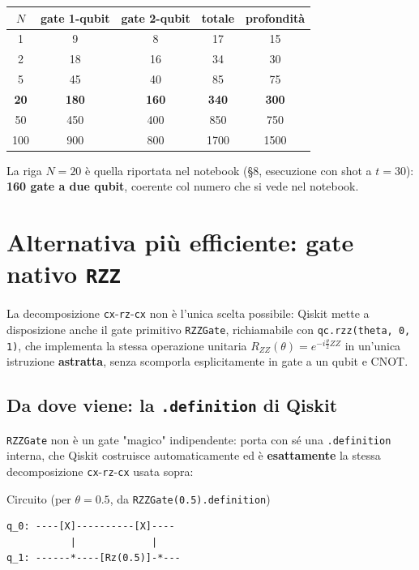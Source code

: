 \documentclass[11pt,a4paper]{article}
\begin{document}
\begin{center}
\renewcommand{\arraystretch}{1.2}
\begin{tabular}{@{}ccccc@{}}
\toprule
\rowcolor{inkblue!10}
$N$ & gate 1-qubit & gate 2-qubit & totale & profondità\\
\midrule
1 & 9 & 8 & 17 & 15\\
2 & 18 & 16 & 34 & 30\\
5 & 45 & 40 & 85 & 75\\
\textbf{20} & \textbf{180} & \textbf{160} & \textbf{340} & \textbf{300}\\
50 & 450 & 400 & 850 & 750\\
100 & 900 & 800 & 1700 & 1500\\
\bottomrule
\end{tabular}
\end{center}

La riga $N=20$ è quella riportata nel notebook (\S 8, esecuzione con
shot a $t=30$): \textbf{160 gate a due qubit}, coerente col numero che
si vede nel notebook.

\section{Alternativa più efficiente: gate nativo \texttt{RZZ}}

La decomposizione \texttt{cx}-\texttt{rz}-\texttt{cx} non è l'unica
scelta possibile: Qiskit mette a disposizione anche il gate primitivo
\texttt{RZZGate}, richiamabile con \texttt{qc.rzz(theta, 0, 1)}, che
implementa la stessa operazione unitaria
$R_{ZZ}(\theta)=e^{-i\frac\theta2 ZZ}$ in un'unica istruzione
\textbf{astratta}, senza scomporla esplicitamente in gate a un qubit e
CNOT.

\subsection*{Da dove viene: la \texttt{.definition} di Qiskit}

\texttt{RZZGate} non è un gate "magico" indipendente: porta con sé una
\texttt{.definition} interna, che Qiskit costruisce automaticamente ed
è \textbf{esattamente} la stessa decomposizione
\texttt{cx}-\texttt{rz}-\texttt{cx} usata sopra:

\begin{panelbox}{Circuito (per $\theta=0.5$, da \texttt{RZZGate(0.5).definition})}
\begin{verbatim}
q_0: ----[X]----------[X]----
           |             |
q_1: ------*----[Rz(0.5)]-*---
\end{verbatim}
\end{panelbox}
\end{document}

